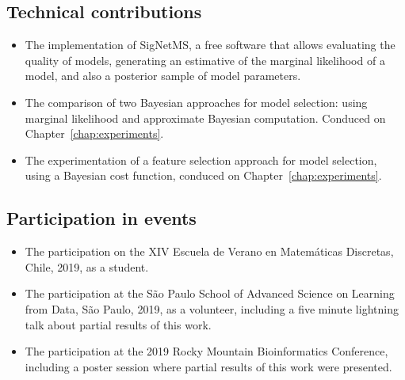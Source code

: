 \subsection{Technical contributions}
\begin{itemize}
\item{The implementation of SigNetMS, a free software that allows
    evaluating the quality of models, generating an estimative of the
    marginal likelihood of a model, and also a posterior sample of model
    parameters.}
\item{The comparison of two Bayesian approaches for model selection:
    using marginal likelihood and approximate Bayesian computation.
    Conduced on Chapter~\ref{chap:experiments}.}
\item{The experimentation of a feature selection approach for model
    selection, using a Bayesian cost function, conduced on
    Chapter~\ref{chap:experiments}.}
\end{itemize}

\subsection{Participation in events}
\begin{itemize}
\item{The participation on the XIV Escuela de Verano en Matemáticas
    Discretas, Chile, 2019, as a student.}
\item{The participation at the São Paulo School of Advanced Science on 
    Learning from Data, São Paulo, 2019, as a volunteer, including a 
    five minute lightning talk about partial results of this work.}
\item{The participation at the 2019 Rocky Mountain Bioinformatics 
    Conference, including a poster session where partial results of this
    work were presented.}
\end{itemize}

